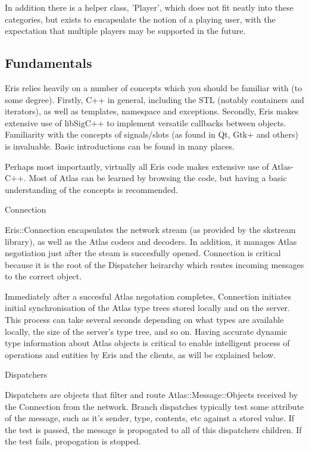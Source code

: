 \documentclass{article}
\begin{document}
{In addition there is a helper class, 'Player', which does not fit neatly into these
categories, but exists to encapsulate the notion of a playing user, with the
expectation that multiple players may be supported in the future.

\subsection{Fundamentals}

Eris relies heavily on a number of concepts which you should be familiar with
(to some degree). Firstly, C++ in general, including the STL (notably containers and
iterators), as well as templates,  namespace and exceptions. Secondly, Eris
makes extensive use of libSigC++ to implement versatile callbacks between objects.
Familiarity with the concepts of signals/slots (as found in Qt, Gtk+ and others) is
invaluable. Basic introductions can be found in many places.

Perhaps most importantly, virtually all Eris code makes extensive use of Atlas-C++.
Most of Atlas can be learned by browsing the code, but having a basic understanding of
the concepts is recommended.

Connection

Eris::Connection encapsulates the network stream (as provided by the skstream library), as well as the Atlas codecs and decoders. In addition, it manages Atlas negotiation just after the steam is succesfully opened. Connection is critical because it is the root of the Dispatcher heirarchy which routes incoming messages to the correct object.

Immediately after a succesful Atlas negotation completes, Connection initiates initial synchronisation of the Atlas type trees stored locally and on the server. This process can take several seconds depending on what types are available locally, the size of the server's type tree, and so on. Having accurate dynamic type information about Atlas objects is critical to enable intelligent process of operations and entities by Eris and the clients, as will be explained below.  

Dispatchers

Dispatchers are objects that filter and route Atlas::Message::Objects received by the Connection from the network. Branch dispatches typically test some attribute of the message, such as it's sender, type, contents, etc against a stored value. If the test is passed, the message is propogated to all of this dispatchers children. If the test fails, propogation is stopped.

}
\end{document}
